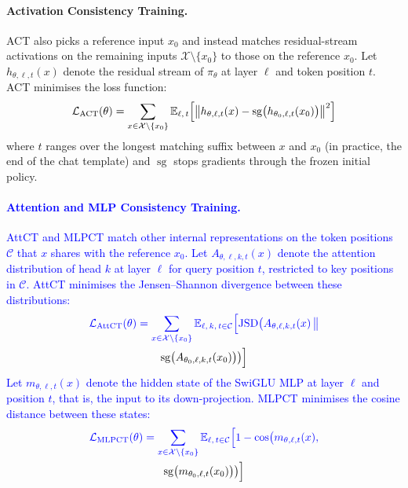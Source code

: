 \documentclass{article}
\begin{document}
\paragraph{Activation Consistency Training.}
ACT \citep{irpan_consistency_2025} also picks a reference input $x_0$ and instead matches residual-stream activations on the remaining inputs $\mathcal{X} \setminus \{x_0\}$ to those on the reference $x_0$. Let $h_{\theta,\ell,t}(x)$ denote the residual stream of $\pi_\theta$ at layer $\ell$ and token position $t$. ACT minimises the loss function:
\begin{equation}
\mathcal{L}_{\text{ACT}}(\theta) = \sum_{x \in \mathcal{X} \setminus \{x_0\}} \mathbb{E}_{\ell,\, t}\Bigl[\bigl\| h_{\theta,\ell,t}(x) - \operatorname{sg}\bigl(h_{\theta_0,\ell,t}(x_0)\bigr) \bigr\|^2\Bigr]
\end{equation}
where $t$ ranges over the longest matching suffix between $x$ and $x_0$ (in practice, the end of the chat template) and $\operatorname{sg}$ stops gradients through the frozen initial policy.

\paragraph{\textcolor{blue}{Attention and MLP Consistency Training.}}
\textcolor{blue}{AttCT and MLPCT \citep{gautam2026consistency} match other internal representations on the token positions $\mathcal{C}$ that $x$ shares with the reference $x_0$.} \textcolor{blue}{Let $A_{\theta,\ell,k,t}(x)$ denote the attention distribution of head $k$ at layer $\ell$ for query position $t$, restricted to key positions in $\mathcal{C}$.} \textcolor{blue}{AttCT minimises the Jensen--Shannon divergence between these distributions:}
\begin{multline}\color{blue}
\mathcal{L}_{\text{AttCT}}(\theta) = \sum_{x \in \mathcal{X} \setminus \{x_0\}} \mathbb{E}_{\ell,\, k,\, t \in \mathcal{C}}\Bigl[\operatorname{JSD}\bigl(A_{\theta,\ell,k,t}(x) \,\big\|\\ \operatorname{sg}\bigl(A_{\theta_0,\ell,k,t}(x_0)\bigr)\bigr)\Bigr]
\end{multline}
\textcolor{blue}{Let $m_{\theta,\ell,t}(x)$ denote the hidden state of the SwiGLU MLP at layer $\ell$ and position $t$, that is, the input to its down-projection.} \textcolor{blue}{MLPCT minimises the cosine distance between these states:}
\begin{multline}\color{blue}
\mathcal{L}_{\text{MLPCT}}(\theta) = \sum_{x \in \mathcal{X} \setminus \{x_0\}} \mathbb{E}_{\ell,\, t \in \mathcal{C}}\Bigl[1 - \cos\bigl(m_{\theta,\ell,t}(x),\\ \operatorname{sg}\bigl(m_{\theta_0,\ell,t}(x_0)\bigr)\bigr)\Bigr]
\end{multline}
\end{document}
